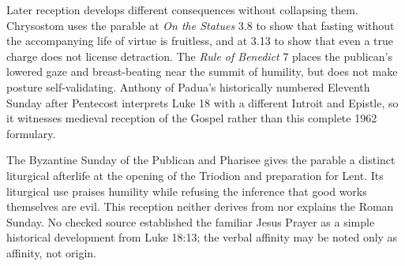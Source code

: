 {Later reception develops different consequences without collapsing them.
Chrysostom uses the parable at \emph{On the Statues} 3.8 to show that fasting
without the accompanying life of virtue is fruitless, and at 3.13 to show
that even a true charge does not license detraction. The \emph{Rule of
Benedict} 7 places the publican's lowered gaze and breast-beating near the
summit of humility, but does not make posture self-validating. Anthony of
Padua's historically numbered Eleventh Sunday after Pentecost interprets
Luke 18 with a different Introit and Epistle, so it witnesses medieval
reception of the Gospel rather than this complete 1962 formulary.

The Byzantine Sunday of the Publican and Pharisee gives the parable a distinct
liturgical afterlife at the opening of the Triodion and preparation for Lent.
Its liturgical use praises humility while refusing the inference that good
works themselves are evil. This reception neither derives from nor explains
the Roman Sunday. No checked source established the familiar Jesus Prayer as
a simple historical development from Luke 18:13; the verbal affinity may be
noted only as affinity, not origin.
}
